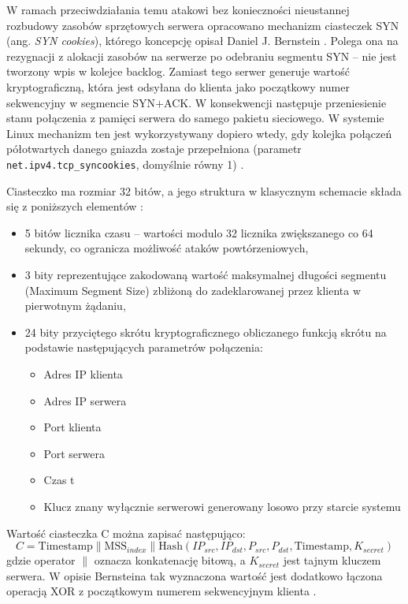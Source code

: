 \documentclass[a4paper,12pt]{article}
\begin{document}
W ramach przeciwdziałania temu atakowi bez konieczności nieustannej rozbudowy zasobów sprzętowych serwera opracowano mechanizm ciasteczek SYN (ang. \textit{SYN cookies}), którego koncepcję opisał Daniel J. Bernstein \cite{rfc4987}. Polega ona na rezygnacji z alokacji zasobów na serwerze po odebraniu segmentu SYN -- nie jest tworzony wpis w kolejce backlog. Zamiast tego serwer generuje wartość kryptograficzną, która jest odsyłana do klienta jako początkowy numer sekwencyjny w segmencie SYN$+$ACK. W konsekwencji następuje przeniesienie stanu połączenia z pamięci serwera do samego pakietu sieciowego. W systemie Linux mechanizm ten jest wykorzystywany dopiero wtedy, gdy kolejka połączeń półotwartych danego gniazda zostaje przepełniona (parametr \texttt{net.ipv4.tcp\_syncookies}, domyślnie równy 1) \cite{kernel_ipsysctl}.

Ciasteczko ma rozmiar 32 bitów, a jego struktura w klasycznym schemacie składa się z poniższych elementów \cite{rfc4987}:
\begin{itemize}
    \item 5 bitów licznika czasu -- wartości modulo 32 licznika zwiększanego co 64 sekundy, co ogranicza możliwość ataków powtórzeniowych,
    \item 3 bity reprezentujące zakodowaną wartość maksymalnej długości segmentu (Maximum Segment Size) zbliżoną do zadeklarowanej przez klienta w pierwotnym żądaniu,
    \item 24 bity przyciętego skrótu kryptograficznego obliczanego funkcją skrótu na podstawie następujących parametrów połączenia:
    \begin{itemize}
        \item Adres IP klienta
        \item Adres IP serwera
        \item Port klienta
        \item Port serwera
        \item Czas t
        \item Klucz znany wyłącznie serwerowi generowany losowo przy starcie systemu
    \end{itemize}
\end{itemize}
Wartość ciasteczka C można zapisać następująco:
$$C = \text{Timestamp} \parallel \text{MSS}_{index} \parallel \text{Hash}(IP_{src}, IP_{dst}, P_{src}, P_{dst}, \text{Timestamp}, K_{secret})$$
gdzie operator $\parallel$ oznacza konkatenację bitową, a $K_{secret}$ jest tajnym kluczem serwera. W opisie Bernsteina tak wyznaczona wartość jest dodatkowo łączona operacją XOR z początkowym numerem sekwencyjnym klienta \cite{rfc4987}.
\end{document}
